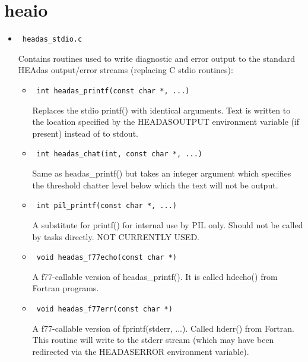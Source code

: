 \documentclass[11pt]{book}
\begin{document}
\section{heaio}

\begin{itemize}
\item            \begin{verbatim} headas_stdio.c \end{verbatim}
            Contains routines used to write diagnostic and error
            output to the standard HEAdas output/error streams
            (replacing C stdio routines):
            \begin{itemize}

            \item      \begin{verbatim} int headas_printf(const char *, ...) \end{verbatim} 
                  Replaces the stdio printf() with identical
                  arguments. Text is written to the location
                  specified by the HEADASOUTPUT
                  environment variable (if present) instead of
                  to stdout.

            \item      \begin{verbatim} int headas_chat(int, const char *, ...) \end{verbatim} 
                  Same as headas\_printf() but takes an
                  integer argument which specifies the
                  threshold chatter level below which the text
                  will not be output.

            \item      \begin{verbatim} int pil_printf(const char *, ...) \end{verbatim} 
                  A substitute for printf() for internal use by
                  PIL only. Should not be called by tasks
                  directly. NOT CURRENTLY USED.

            \item      \begin{verbatim} void headas_f77echo(const char *) \end{verbatim} 
                  A f77-callable version of headas\_printf().
                  It is called hdecho() from Fortran programs.

            \item      \begin{verbatim} void headas_f77err(const char *) \end{verbatim} 
                  A f77-callable version of fprintf(stderr,
                  ...). Called hderr() from Fortran. This
                  routine will write to the stderr stream (which
                  may have been redirected via the
                  HEADASERROR environment variable).


\end{itemize}
\end{itemize}
\end{document}
